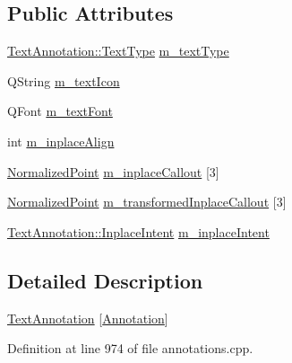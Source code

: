 \subsection*{Public Attributes}
\begin{DoxyCompactItemize}
\item 
\hyperlink{classOkular_1_1TextAnnotation_af560204454bf812797bc95bea730b06e}{Text\+Annotation\+::\+Text\+Type} \hyperlink{classOkular_1_1TextAnnotationPrivate_a585ca2578e082542e18b445ea37cb3af}{m\+\_\+text\+Type}
\item 
Q\+String \hyperlink{classOkular_1_1TextAnnotationPrivate_a1df47fe4d3a7175b5536650d3d23b0f2}{m\+\_\+text\+Icon}
\item 
Q\+Font \hyperlink{classOkular_1_1TextAnnotationPrivate_a2b22283c721246cd6fb8438a2325d4a4}{m\+\_\+text\+Font}
\item 
int \hyperlink{classOkular_1_1TextAnnotationPrivate_ab61fd57ec0bf98230cabd0d508cec3d4}{m\+\_\+inplace\+Align}
\item 
\hyperlink{classOkular_1_1NormalizedPoint}{Normalized\+Point} \hyperlink{classOkular_1_1TextAnnotationPrivate_a78038b3c94f975a41c4f30acd5ed6032}{m\+\_\+inplace\+Callout} \mbox{[}3\mbox{]}
\item 
\hyperlink{classOkular_1_1NormalizedPoint}{Normalized\+Point} \hyperlink{classOkular_1_1TextAnnotationPrivate_a5ef2fb11f768115741328be2325d4453}{m\+\_\+transformed\+Inplace\+Callout} \mbox{[}3\mbox{]}
\item 
\hyperlink{classOkular_1_1TextAnnotation_a6494ecc81861c6b3da81aa98a3cd16c5}{Text\+Annotation\+::\+Inplace\+Intent} \hyperlink{classOkular_1_1TextAnnotationPrivate_abf5061c7495736518eb3ded69034b9f4}{m\+\_\+inplace\+Intent}
\end{DoxyCompactItemize}


\subsection{Detailed Description}
\hyperlink{classOkular_1_1TextAnnotation}{Text\+Annotation} \mbox{[}\hyperlink{classOkular_1_1Annotation}{Annotation}\mbox{]} 

Definition at line 974 of file annotations.\+cpp.



